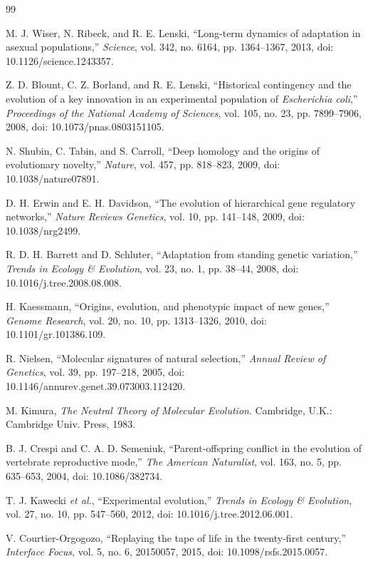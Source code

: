 \documentclass[conference]{IEEEtran}
\begin{document}
\balance
\begin{thebibliography}{99}

M. J. Wiser, N. Ribeck, and R. E. Lenski, ``Long-term dynamics of adaptation in asexual populations,'' \emph{Science}, vol. 342, no. 6164, pp. 1364--1367, 2013, doi: 10.1126/science.1243357.

Z. D. Blount, C. Z. Borland, and R. E. Lenski, ``Historical contingency and the evolution of a key innovation in an experimental population of \emph{Escherichia coli},'' \emph{Proceedings of the National Academy of Sciences}, vol. 105, no. 23, pp. 7899--7906, 2008, doi: 10.1073/pnas.0803151105.

N. Shubin, C. Tabin, and S. Carroll, ``Deep homology and the origins of evolutionary novelty,'' \emph{Nature}, vol. 457, pp. 818--823, 2009, doi: 10.1038/nature07891.

D. H. Erwin and E. H. Davidson, ``The evolution of hierarchical gene regulatory networks,'' \emph{Nature Reviews Genetics}, vol. 10, pp. 141--148, 2009, doi: 10.1038/nrg2499.

R. D. H. Barrett and D. Schluter, ``Adaptation from standing genetic variation,'' \emph{Trends in Ecology \& Evolution}, vol. 23, no. 1, pp. 38--44, 2008, doi: 10.1016/j.tree.2008.08.008.

H. Kaessmann, ``Origins, evolution, and phenotypic impact of new genes,'' \emph{Genome Research}, vol. 20, no. 10, pp. 1313--1326, 2010, doi: 10.1101/gr.101386.109.

R. Nielsen, ``Molecular signatures of natural selection,'' \emph{Annual Review of Genetics}, vol. 39, pp. 197--218, 2005, doi: 10.1146/annurev.genet.39.073003.112420.

M. Kimura, \emph{The Neutral Theory of Molecular Evolution}. Cambridge, U.K.: Cambridge Univ. Press, 1983.

B. J. Crespi and C. A. D. Semeniuk, ``Parent-offspring conflict in the evolution of vertebrate reproductive mode,'' \emph{The American Naturalist}, vol. 163, no. 5, pp. 635--653, 2004, doi: 10.1086/382734.

T. J. Kawecki \emph{et al.}, ``Experimental evolution,'' \emph{Trends in Ecology \& Evolution}, vol. 27, no. 10, pp. 547--560, 2012, doi: 10.1016/j.tree.2012.06.001.

V. Courtier-Orgogozo, ``Replaying the tape of life in the twenty-first century,'' \emph{Interface Focus}, vol. 5, no. 6, 20150057, 2015, doi: 10.1098/rsfs.2015.0057.


\end{thebibliography}
\end{document}
